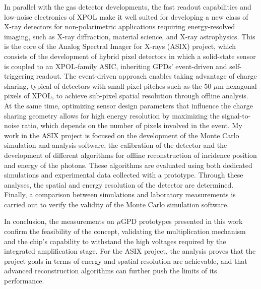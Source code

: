 \documentclass[12pt, a4paper]{article}
\begin{document}
In parallel with the gas detector developments, the fast readout capabilities and low-noise electronics of XPOL make it well suited for developing a new class of X-ray detectors for non-polarimetric applications requiring energy-resolved imaging, such as X-ray diffraction, material science, and X-ray astrophysics. This is the core of the Analog Spectral Imager for X-rays (ASIX) project, which consists of the development of hybrid pixel detectors in which a solid-state sensor is coupled to an XPOL-family ASIC, inheriting GPDs' event-driven and self-triggering readout. The event-driven approach enables taking advantage of charge sharing, typical of detectors with small pixel pitches such as the 50 $\mu$m hexagonal pixels of XPOL, to achieve sub-pixel spatial resolution through offline analysis. At the same time, optimizing sensor design parameters that influence the charge sharing geometry allows for high energy resolution by maximizing the signal-to-noise ratio, which depends on the number of pixels involved in the event. My work in the ASIX project is focused on the development of the Monte Carlo simulation and analysis software, the calibration of the detector and the development of different algorithms for offline reconstruction of incidence position and energy of the photons. These algorithms are evaluated using both dedicated simulations and experimental data collected with a prototype. Through these analyses, the spatial and energy resolution of the detector are determined. Finally, a comparison between simulations and laboratory measurements is carried out to verify the validity of the Monte Carlo simulation software.

In conclusion, the measurements on $\mu$GPD prototypes presented in this work confirm the feasibility of the concept, validating the multiplication mechanism and the chip's capability to withstand the high voltages required by the integrated amplification stage. For the ASIX project, the analysis proves that the project goals in terms of energy and spatial resolution are achievable, and that advanced reconstruction algorithms can further push the limits of its performance.
\end{document}
